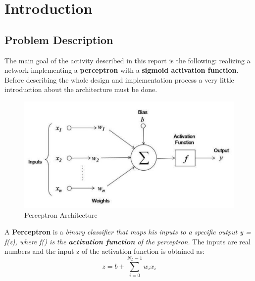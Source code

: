 \chapter{Introduction}
\section{Problem Description}
The main goal of the activity described in this report is the following: realizing a network implementing a \textbf{perceptron} with a \textbf{sigmoid activation function}.\\
Before describing the whole design and implementation process a very little introduction about the architecture must be done.\\

\begin{figure}[h]
	\centering
	\includegraphics[width=\textwidth]{img/perceptron.png}
	\caption{Perceptron Architecture}
\end{figure}

A \textbf{Perceptron} is a \textit{binary classifier that maps his inputs to a specific output y = f(z), where f() is the \textbf{activation function} of the perceptron.} The inputs are real numbers and the input z of the activation function is obtained as:\\
\begin{equation}
	z = b + \sum_{i = 0}^{N_{L}-1}w_{i}x_{i}
\end{equation}

